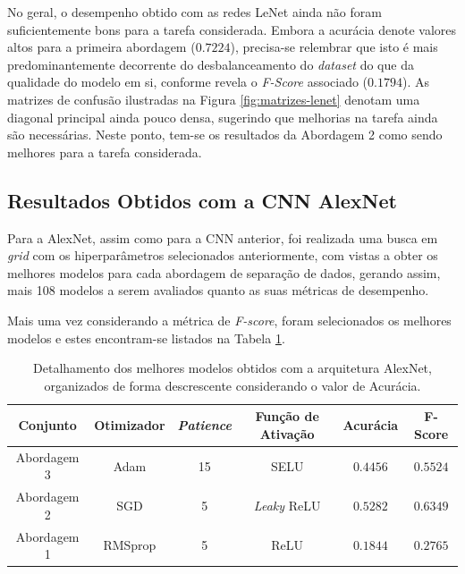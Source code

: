 No geral, o desempenho obtido com as redes LeNet ainda não foram suficientemente bons para a tarefa considerada. Embora a acurácia denote valores altos para a primeira abordagem ($0.7224$), precisa-se relembrar que isto é mais predominantemente decorrente do desbalanceamento do \emph{dataset} do que da qualidade do modelo em si, conforme revela o \emph{F-Score} associado ($0.1794$). As matrizes de confusão ilustradas na Figura \ref{fig:matrizes-lenet} denotam uma diagonal principal ainda pouco densa, sugerindo que melhorias na tarefa ainda são necessárias. Neste ponto, tem-se os resultados da Abordagem 2 como sendo melhores para a tarefa considerada.



\subsection{Resultados Obtidos com a CNN AlexNet}
\label{sec:alexnet}

 Para a AlexNet, assim como para a CNN anterior, foi realizada uma busca em \emph{grid} com os hiperparâmetros selecionados anteriormente, com vistas a obter os melhores modelos para cada abordagem de separação de dados, gerando assim, mais 108 modelos a serem avaliados quanto as suas métricas de desempenho.

 Mais uma vez considerando a métrica de \emph{F-score}, foram selecionados os melhores modelos e estes encontram-se listados na Tabela \ref{tab:alexnet}.

 \begin{table}[h!]
 \centering
 \caption{Detalhamento dos melhores modelos obtidos com a arquitetura AlexNet, organizados de forma descrescente considerando o valor de Acurácia.}
 \label{tab:alexnet}
 \begin{tabular}{cccccc}
 \toprule
 \textbf{Conjunto} & \textbf{Otimizador} & \textbf{\emph{Patience}}  & \textbf{Função de Ativação} & \textbf{Acurácia} & \textbf{F-Score} \\
 \midrule
 Abordagem 3 & Adam & 15 & SELU & $0.4456$ & $0.5524$ \\
 Abordagem 2 & SGD & 5 & \emph{Leaky} ReLU & $0.5282$ & $0.6349$ \\
 Abordagem 1 & RMSprop & 5 & ReLU & $0.1844$ & $0.2765$ \\
 \bottomrule
 \end{tabular}
\end{table}


